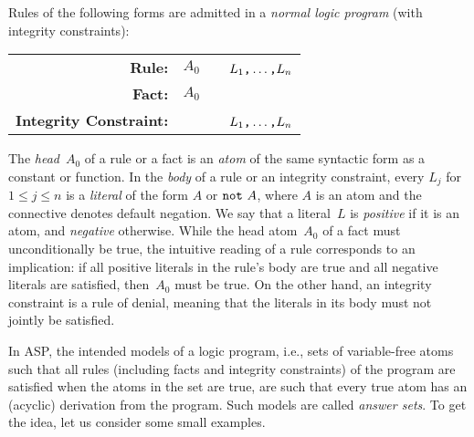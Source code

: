 Rules of the following forms are admitted in a 
\emph{normal logic program} (with integrity constraints):
\par
\medskip
\begin{tabular}{rl@{}l}\label{eq:normal:rule}
\textbf{Rule:} & $A_0$&~\code{:-}~$L_1\text{\texttt{,}}\dots\text{\texttt{,}}L_n$\code{.}
\\
\textbf{Fact:} & $A_0$&\code{.}
\\
\textbf{Integrity Constraint:} & &~\code{:-}~$L_1\texttt{,}\dots\texttt{,}L_n$\code{.}
\end{tabular}
%
%
%
\par
\medskip
\noindent
The \emph{head}~$A_0$ of a rule or a fact is an \emph{atom} of the same 
syntactic form as a constant or function.
%
In the \emph{body} of a rule or an integrity constraint,
every $L_j$ for $1\leq j\leq n$ is a \emph{literal} of the form $A$ or $\texttt{not}~A$,
where $A$ is an atom and
the connective  denotes default negation.
%
%
We say that a literal~$L$ is \emph{positive} if it is an atom,
and \emph{negative} otherwise.
While the head atom~$A_0$ of a fact must unconditionally be true,
the intuitive reading of a rule corresponds to an implication:
if all positive literals in the rule's body are true and all negative
literals are satisfied, then~$A_0$ must be true.
On the other hand, an integrity constraint is a rule of denial,
meaning that the literals in its body must not jointly be satisfied.

In ASP, the intended models of a logic program, i.e.,
sets of variable-free atoms such that all rules
(including facts and integrity constraints)
of the program are satisfied when the atoms in the set are true, 
are such that every true atom has an (acyclic) derivation from the program.
Such models are called \emph{answer sets}.
To get the idea, let us consider some small examples.

